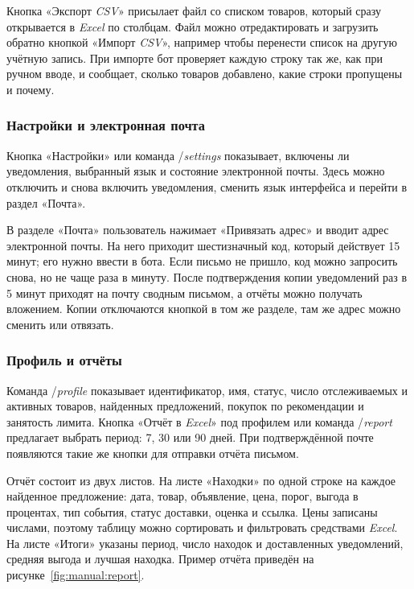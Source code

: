 Кнопка «Экспорт \textit{CSV}» присылает файл со списком товаров, который сразу открывается в \textit{Excel} по столбцам. Файл можно отредактировать и загрузить обратно кнопкой «Импорт \textit{CSV}», например чтобы перенести список на другую учётную запись. При импорте бот проверяет каждую строку так же, как при ручном вводе, и сообщает, сколько товаров добавлено, какие строки пропущены и почему.

\subsubsection{Настройки и электронная почта}

Кнопка «Настройки» или команда /\textit{settings} показывает, включены ли уведомления, выбранный язык и состояние электронной почты. Здесь можно отключить и снова включить уведомления, сменить язык интерфейса и перейти в раздел «Почта».

В разделе «Почта» пользователь нажимает «Привязать адрес» и вводит адрес электронной почты. На него приходит шестизначный код, который действует 15 минут; его нужно ввести в бота. Если письмо не пришло, код можно запросить снова, но не чаще раза в минуту. После подтверждения копии уведомлений раз в 5 минут приходят на почту сводным письмом, а отчёты можно получать вложением. Копии отключаются кнопкой в том же разделе, там же адрес можно сменить или отвязать.

\subsubsection{Профиль и отчёты}

Команда /\textit{profile} показывает идентификатор, имя, статус, число отслеживаемых и активных товаров, найденных предложений, покупок по рекомендации и занятость лимита. Кнопка «Отчёт в \textit{Excel}» под профилем или команда /\textit{report} предлагает выбрать период: 7, 30 или 90 дней. При подтверждённой почте появляются такие же кнопки для отправки отчёта письмом.

Отчёт состоит из двух листов. На листе «Находки» по одной строке на каждое найденное предложение: дата, товар, объявление, цена, порог, выгода в процентах, тип события, статус доставки, оценка и ссылка. Цены записаны числами, поэтому таблицу можно сортировать и фильтровать средствами \textit{Excel}. На листе «Итоги» указаны период, число находок и доставленных уведомлений, средняя выгода и лучшая находка. Пример отчёта приведён на рисунке~\ref{fig:manual:report}.

